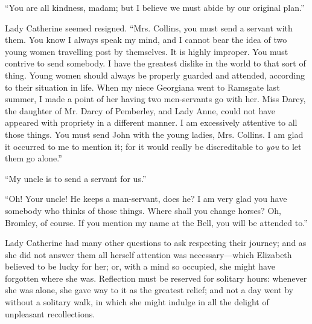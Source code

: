 \documentclass[12pt,openright]{book}
\begin{document}
“You are all kindness, madam; but I believe we must abide by our original plan.”

Lady Catherine seemed resigned. “Mrs. Collins, you must send a servant with them. You know I always speak my mind, and I cannot bear the idea of two young women travelling post by themselves. It is highly improper. You must contrive to send somebody. I have the greatest dislike in the world to that sort of thing. Young women should always be properly guarded and attended, according to their situation in life. When my niece Georgiana went to Ramsgate last summer, I made a point of her having two men-servants go with her. Miss Darcy, the daughter of Mr. Darcy of Pemberley, and Lady Anne, could not have appeared with propriety in a different manner. I am excessively attentive to all those things. You must send John with the young ladies, Mrs. Collins. I am glad it occurred to me to mention it; for it would really be discreditable to \textit{you} to let them go alone.”

“My uncle is to send a servant for us.”

“Oh! Your uncle! He keeps a man-servant, does he? I am very glad you have somebody who thinks of those things. Where shall you change horses? Oh, Bromley, of course. If you mention my name at the Bell, you will be attended to.”

Lady Catherine had many other questions to ask respecting their journey; and as she did not answer them all herself attention was necessary—which Elizabeth believed to be lucky for her; or, with a mind so occupied, she might have forgotten where she was. Reflection must be reserved for solitary hours: whenever she was alone, she gave way to it as the greatest relief; and not a day went by without a solitary walk, in which she might indulge in all the delight of unpleasant recollections.
\end{document}
